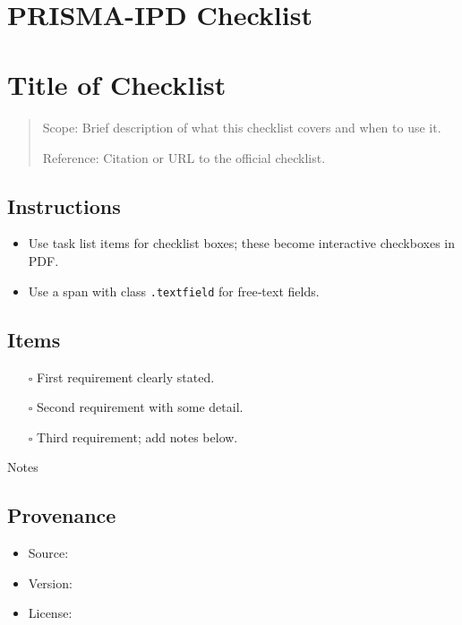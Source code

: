 \documentclass[11pt]{article}
\def\tightlist{}
\begin{document}
\begin{center}
{\LARGE }\\[4pt]
\normalsize 
\end{center}
\vspace{1em}

\begin{Form}

\section{PRISMA-IPD Checklist}\label{prisma-ipd-checklist}

\section{Title of Checklist}\label{title-of-checklist}

\begin{quote}
Scope: Brief description of what this checklist covers and when to use
it.

Reference: Citation or URL to the official checklist.
\end{quote}

\subsection{Instructions}\label{instructions}

\begin{itemize}
\tightlist
\item
  Use task list items for checklist boxes; these become interactive
  checkboxes in PDF.
\item
  Use a span with class \texttt{.textfield} for free‑text fields.
\end{itemize}

\subsection{Items}\label{items}

\begin{itemize}
\tightlist
\item[$\square$]
  First requirement clearly stated.
\item[$\square$]
  Second requirement with some detail.
\item[$\square$]
  Third requirement; add notes below.
\end{itemize}

{Notes}

\subsection{Provenance}\label{provenance}

\begin{itemize}
\tightlist
\item
  Source:
\item
  Version:
\item
  License:
\end{itemize}

\end{Form}
\end{document}
